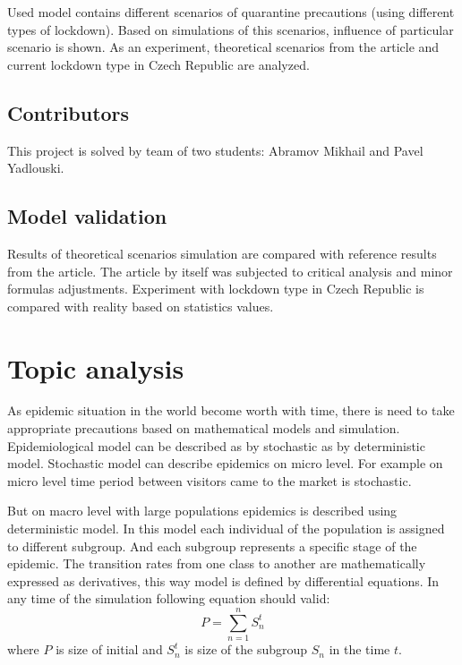 \documentclass[12pt,a4paper,english]{article}
\begin{document}
    Used model contains different scenarios of quarantine precautions (using different types of lockdown).
    Based on simulations of this scenarios, influence of particular scenario is shown. 
    As an experiment, theoretical scenarios from the article and current lockdown type in Czech Republic are analyzed.

    \subsection{Contributors}    
    This project is solved by team of two students: Abramov Mikhail and Pavel 
    Yadlouski.
    
    \subsection{Model validation}
    Results of theoretical scenarios simulation are compared with reference results from the article. 
    The article by itself was subjected to critical analysis and minor formulas adjustments.
    Experiment with lockdown type in Czech Republic is compared with reality based on statistics values.
    
    \section{Topic analysis}

    As epidemic situation in the world become worth with time, there is need to take appropriate precautions based on mathematical models and simulation.
    Epidemiological model can be described as by stochastic as by deterministic model.
    Stochastic model can describe epidemics on micro level.
    For example on micro level time period between visitors came to the market is stochastic.
   
    But on macro level with large populations epidemics is described using deterministic model.
    In this model each individual of the population is assigned to different subgroup.
    And each subgroup represents a specific stage of the epidemic.
    The transition rates from one class to another are mathematically expressed as derivatives, this way model is defined by differential equations.
    In any time of the simulation following equation should valid:
    \begin{equation}
        \label{primary_question}
        P = \sum_{n = 1}^{n} S^t_n
      \end{equation}
    where $P$ is size of initial and $S^t_n$ is size of the subgroup $S_n$ in the time $t$. 
\end{document}
